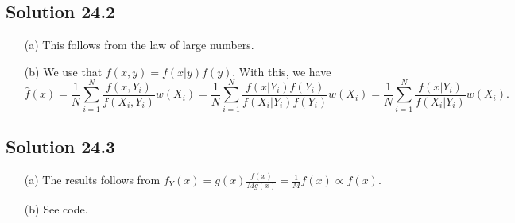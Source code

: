 \subsection*{Solution 24.2}

\begin{itemize}
    \item[(a)] This follows from the law of large numbers.
    \item[(b)] We use that $f(x, y) = f(x|y) f(y)$.
        With this, we have
        \begin{equation*}
            \hat{f}(x) = \frac{1}{N} \sum_{i = 1}^N \frac{f(x, Y_i)}{f(X_i, Y_i)} w(X_i)
                = \frac{1}{N} \sum_{i = 1}^N \frac{f(x|Y_i) f(Y_i)}{f(X_i|Y_i) f(Y_i)} w(X_i)
                = \frac{1}{N} \sum_{i = 1}^N \frac{f(x|Y_i)}{f(X_i|Y_i)} w(X_i).
        \end{equation*}
\end{itemize}


\subsection*{Solution 24.3}

\begin{itemize}
    \item[(a)] The results follows from $f_Y(x) = g(x) \frac{f(x)}{M g(x)} = \frac{1}{M} f(x) \propto f(x)$.
    \item[(b)] See code.
\end{itemize}
